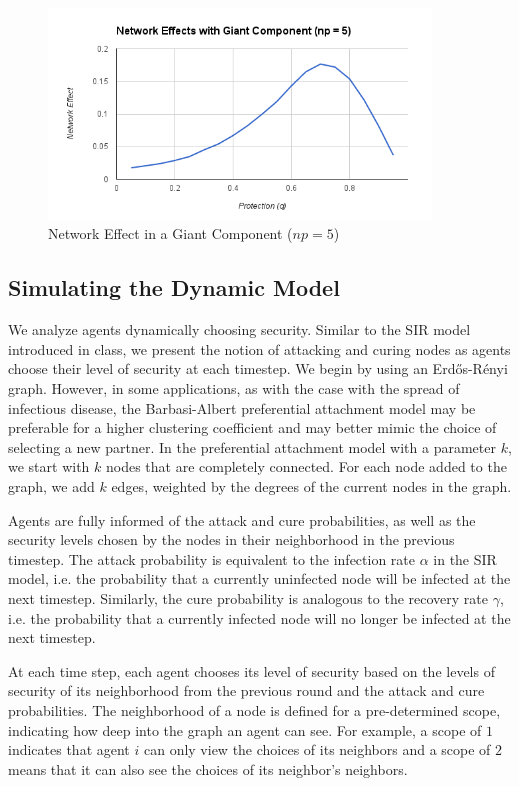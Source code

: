 \documentclass{article}
\theoremstyle{plain}
\begin{document}
\begin{figure}[h!]
  \centering
  \includegraphics[width=4in]{network_effects_np5.png}
  \caption{Network Effect in a Giant Component ($np = 5$)}
  \label{network_effects_np5.fig}
\end{figure}

\subsection{Simulating the Dynamic Model}

We analyze agents dynamically choosing security. Similar to the SIR model introduced in class, we present the notion of attacking and curing nodes as agents choose their level of security at each timestep. We begin by using an Erd\H{o}s-R\'{e}nyi graph. However, in some applications, as with the case with the spread of infectious disease, the Barbasi-Albert preferential attachment model may be preferable for a higher clustering coefficient and may better mimic the choice of selecting a new partner. In the preferential attachment model with a parameter $k$, we start with $k$ nodes that are completely connected. For each node added to the graph, we add $k$ edges, weighted by the degrees of the current nodes in the graph.

Agents are fully informed of the attack and cure probabilities, as well as the security levels chosen by the nodes in their neighborhood in the previous timestep. The attack probability is equivalent to the infection rate $\alpha$ in the SIR model, i.e. the probability that a currently uninfected node will be infected at the next timestep. Similarly, the cure probability is analogous to the recovery rate $\gamma$, i.e. the probability that a currently infected node will no longer be infected at the next timestep.

At each time step, each agent chooses its level of security based on the levels of security of its neighborhood from the previous round and the attack and cure probabilities. The neighborhood of a node is defined for a pre-determined scope, indicating how deep into the graph an agent can see. For example, a scope of $1$ indicates that  agent $i$ can only view the choices of its neighbors and a scope of $2$ means that it can also see the choices of its neighbor's neighbors.
\end{document}
